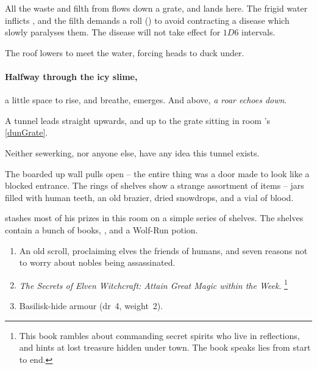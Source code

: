 
All the waste and filth from  flows down a grate, and lands here.
The frigid water inflicts , and the filth demands a  roll (\tn[10]) to avoid contracting a disease which slowly paralyses them.%
The disease will not take effect for $1D6$ \glspl{interval}.

The roof lowers to meet the water, forcing heads to duck under.

\paragraph{Halfway through the icy slime,}
a little space to rise, and breathe, emerges.
And above, \emph{a roar echoes down}.

A tunnel leads straight upwards, and up to the grate sitting in room 's \vref{dunGrate}.

Neither \gls{sewerking}, nor anyone else, have any idea this tunnel exists.

\begin{boxtext}
  The boarded up wall pulls open -- the entire thing was a door made to look like a blocked entrance.
  The rings of shelves show a strange assortment of items -- jars filled with human teeth, an old brazier, dried snowdrops, and a vial of blood.
\end{boxtext}


 stashes most of his prizes in this room on a simple series of shelves.
The shelves contain a bunch of books, \lootMagic, and a Wolf-Run potion.

\begin{enumerate}
  \item
  An old scroll, proclaiming elves the friends of humans, and seven reasons not to worry about nobles being assassinated.
  \item
  \textit{The Secrets of Elven Witchcraft: Attain Great Magic within the Week}.%
  \footnote{This book rambles about commanding secret spirits who live in reflections, and hints at lost treasure hidden under \gls{town}.
  The book speaks lies from start to end.}
  \item
  Basilisk-hide armour (\gls{dr}~4, \gls{weight}~2).
\end{enumerate}

